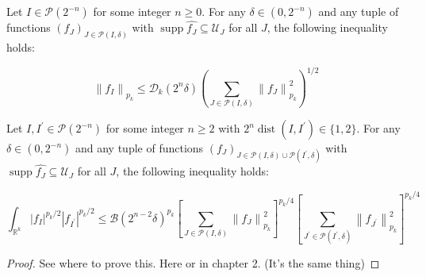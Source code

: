 \begin{lem}
 Let $I \in \mathcal{P}\left(2^{-n}\right)$ for some integer $n \geqslant 0$. For any $\delta \in\left(0,2^{-n}\right)$ and any tuple of functions $\left(f_{J}\right)_{J \in \mathcal{P}(I, \delta)}$ with $\operatorname{supp} \widehat{f_{J}} \subseteq \mathcal{U}_{J}$ for all $J$, the following inequality holds:


\begin{equation*}
\left\|f_{I}\right\|_{p_{k}} \leqslant \mathcal{D}_{k}\left(2^{n} \delta\right)\left(\sum_{J \in \mathcal{P}(I, \delta)}\left\|f_{J}\right\|_{p_{k}}^{2}\right)^{1 / 2} 
\end{equation*}

Let $I, I^{\prime} \in \mathcal{P}\left(2^{-n}\right)$ for some integer $n \geqslant 2$ with $2^{n} \operatorname{dist}\left(I, I^{\prime}\right) \in\{1,2\}$. For any $\delta \in\left(0,2^{-n}\right)$ and any tuple of functions $\left(f_{J}\right)_{J \in \mathcal{P}(I, \delta) \cup \mathcal{P}\left(I^{\prime}, \delta\right)}$ with $\operatorname{supp} \widehat{f_{J}} \subseteq \mathcal{U}_{J}$ for all $J$, the following inequality holds:


\begin{equation*}
\int_{\mathbb{R}^{k}}\left|f_{I}\right|^{p_{k} / 2}\left|f_{I^{\prime}}\right|^{p_{k} / 2} \leqslant \mathcal{B}\left(2^{n-2} \delta\right)^{p_{k}}\left[\sum_{J \in \mathcal{P}(I, \delta)}\left\|f_{J}\right\|_{p_{k}}^{2}\right]^{p_{k} / 4}\left[\sum_{J^{\prime} \in \mathcal{P}\left(I^{\prime}, \delta\right)}\left\|f_{J^{\prime}}\right\|_{p_{k}}^{2}\right]^{p_{k} / 4} 
\end{equation*}
\end{lem}
\begin{proof}
    See where to prove this. Here or in chapter 2. (It's the same thing)
\end{proof}
